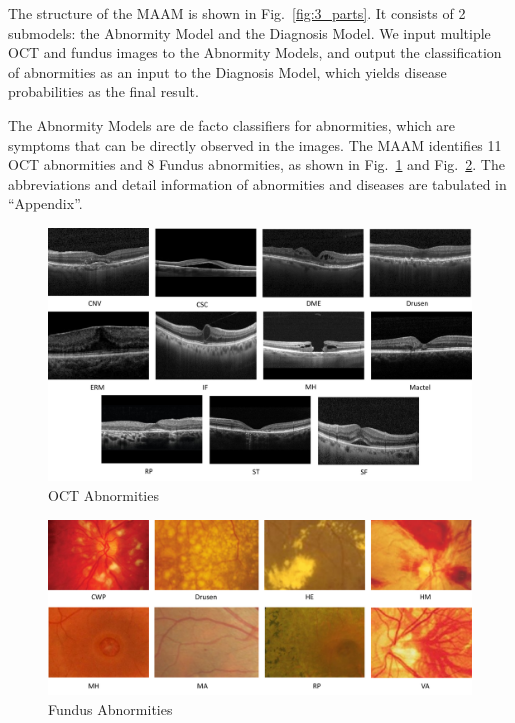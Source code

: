 \documentclass{article}
\begin{document}
	The structure of the MAAM is shown in Fig.~\ref{fig:3_parts}. It consists of 2 submodels: the Abnormity Model and the Diagnosis Model. We input multiple OCT and fundus images to the Abnormity Models, and output the classification of abnormities as an input to the Diagnosis Model, which yields disease probabilities as the final result.
	
	\vspace{0.5cm}
	
	The Abnormity Models are de facto classifiers for abnormities, which are symptoms that can be directly observed in the images. The MAAM identifies 11 OCT abnormities and 8 Fundus abnormities, as shown in Fig.~\ref{fig:OCT_abnormities} and Fig.~\ref{fig:fundus_abnormities}. The abbreviations and detail information of abnormities and diseases are tabulated in ``Appendix''.
	
	\begin{figure}[htbp]
		\centering
		\includegraphics[width=\linewidth]{Figs/OCT_Abnormities.pdf}
		\caption{OCT Abnormities \autocite{Duker_Waheed_Goldman_2022}}
		\vspace{0.3cm}
		\label{fig:OCT_abnormities}
	\end{figure}
	
	\begin{figure}[htbp]
		\centering
		\includegraphics[width=\linewidth]{Figs/fundus_Abnormities.pdf}
		\caption{Fundus Abnormities \autocite{Wolf_Kirchhof_Reim_2006}}
		\vspace{0.3cm}
		\label{fig:fundus_abnormities}
	\end{figure}
	
\end{document}
